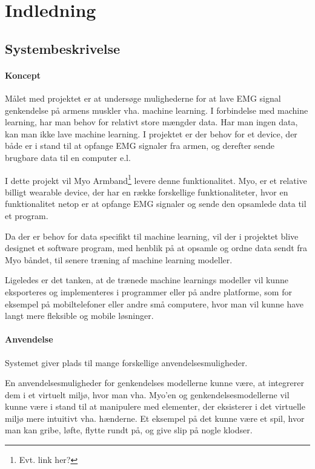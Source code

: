 \thispagestyle{fancy}
\chapter{Indledning}
\label{chp:indledning}

\section{Systembeskrivelse}

\subsubsection{Koncept}
Målet med projektet er at undersøge mulighederne for at lave EMG signal genkendelse på armens muskler vha. machine learning.
I forbindelse med machine learning, har man behov for relativt store mængder data. Har man ingen data, kan man ikke lave machine learning. I projektet er der behov for et device, der både er i stand til at opfange EMG signaler fra armen,  og derefter sende brugbare data til en computer e.l.
 
I dette projekt vil Myo Armband\footnote{Evt. link her?} levere denne funktionalitet. Myo, er et relative billigt wearable device, der har en række forskellige funktionaliteter, hvor en funktionalitet netop er at opfange EMG signaler og sende den opsamlede data til et program. 

Da der er behov for data specifikt til machine learning, vil der i projektet blive designet et software program, med henblik på at opsamle og ordne data sendt fra Myo båndet, til senere træning af machine learning modeller.

Ligeledes er det tanken, at de trænede machine learnings modeller vil kunne eksporteres og implementeres i programmer eller på andre platforme, som for eksempel på mobiltelefoner eller andre små computere, hvor man vil kunne have langt mere fleksible og mobile løsninger.

\subsubsection{Anvendelse}
Systemet giver plads til mange forskellige anvendelsesmuligheder.

En anvendelsesmuligheder for genkendelses modellerne kunne være, at integrerer dem i et virtuelt miljø, hvor man vha. Myo’en og genkendelsesmodellerne vil kunne være i stand til at manipulere med elementer, der eksisterer i det virtuelle miljø mere intuitivt vha. hænderne. Et eksempel på det kunne være et spil, hvor man kan gribe, løfte, flytte rundt på, og give slip på nogle klodser.

